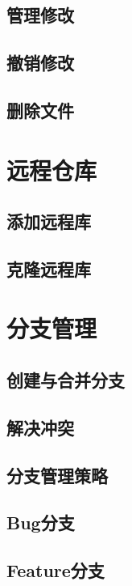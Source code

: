 \subsection{管理修改}

\subsection{撤销修改}

\subsection{删除文件}

\section{远程仓库}

\subsection{添加远程库}

\subsection{克隆远程库}

\section{分支管理}

\subsection{创建与合并分支}

\subsection{解决冲突}

\subsection{分支管理策略}

\subsection{Bug分支}

\subsection{Feature分支}

